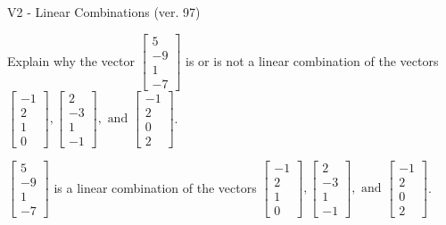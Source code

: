 \begin{exercise}
  \begin{exerciseTitle}V2 - Linear Combinations (ver. 97)\end{exerciseTitle}
  \begin{exerciseStatement}
    Explain why the vector \(\left[\begin{array}{c}
5 \\
-9 \\
1 \\
-7
\end{array}\right]\)  is or is not a linear 
	combination of the vectors \(\left[\begin{array}{c}
-1 \\
2 \\
1 \\
0
\end{array}\right] , \left[\begin{array}{c}
2 \\
-3 \\
1 \\
-1
\end{array}\right] , \text{ and } \left[\begin{array}{c}
-1 \\
2 \\
0 \\
2
\end{array}\right]\).
	


  \end{exerciseStatement}
  \begin{exerciseAnswer}
   \(\left[\begin{array}{c}
5 \\
-9 \\
1 \\
-7
\end{array}\right]\) 
  	 is  
	a linear combination of the vectors \(\left[\begin{array}{c}
-1 \\
2 \\
1 \\
0
\end{array}\right] , \left[\begin{array}{c}
2 \\
-3 \\
1 \\
-1
\end{array}\right] , \text{ and } \left[\begin{array}{c}
-1 \\
2 \\
0 \\
2
\end{array}\right]\).

	
  


  \end{exerciseAnswer}
\end{exercise}